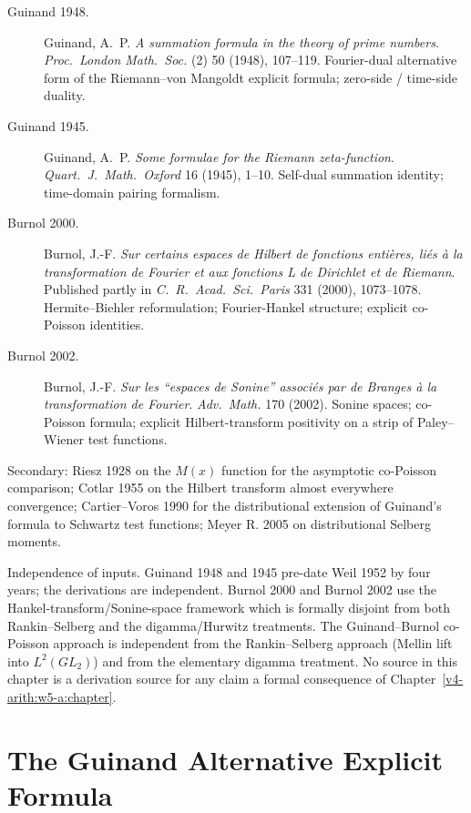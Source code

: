 \begin{description}
\item[Guinand 1948.] Guinand, A.~P. \emph{A summation formula in the
theory of prime numbers}. \emph{Proc.~London Math.~Soc.} (2) 50
(1948), 107--119. Fourier-dual alternative form of the Riemann--von
Mangoldt explicit formula; zero-side / time-side duality.
\item[Guinand 1945.] Guinand, A.~P. \emph{Some formulae for the
Riemann zeta-function}. \emph{Quart.~J.~Math.~Oxford} 16 (1945),
1--10. Self-dual summation identity; time-domain pairing formalism.
\item[Burnol 2000.] Burnol, J.-F. \emph{Sur
certains espaces de Hilbert de fonctions enti\`eres, li\'es \`a la
transformation de Fourier et aux fonctions L de Dirichlet et de
Riemann}. Published partly in \emph{C.~R.~Acad.~Sci.~Paris} 331
(2000), 1073--1078. Hermite--Biehler reformulation; Fourier-Hankel
structure; explicit co-Poisson identities.
\item[Burnol 2002.] Burnol, J.-F. \emph{Sur les
``espaces de Sonine'' associ\'es par de Branges \`a la transformation
de Fourier}. \emph{Adv.~Math.} 170 (2002). Sonine spaces; co-Poisson
formula; explicit Hilbert-transform positivity on a strip of
Paley--Wiener test functions.
\end{description}

Secondary: Riesz 1928 on the \(M(x)\) function for the asymptotic
co-Poisson comparison; Cotlar 1955 on the Hilbert transform almost
everywhere convergence; Cartier--Voros 1990 for the distributional
extension of Guinand's formula to Schwartz test functions; Meyer R.
2005 on distributional Selberg moments.

Independence of inputs. Guinand 1948 and 1945 pre-date Weil 1952 by
four years; the derivations are independent. Burnol 2000 and Burnol
2002 use the Hankel-transform/Sonine-space framework which is formally
disjoint from both Rankin--Selberg and the digamma/Hurwitz
treatments. The Guinand--Burnol co-Poisson approach is independent from the
Rankin--Selberg approach (Mellin lift into \(L^{2}(GL_{2})\)) and from
the elementary digamma treatment. No source in this chapter is a derivation
source for any claim a formal consequence of Chapter~\ref{v4-arith:w5-a:chapter}.

\section{The Guinand Alternative Explicit Formula}
\label{v4-arith:w7-i:guinand-explicit}

